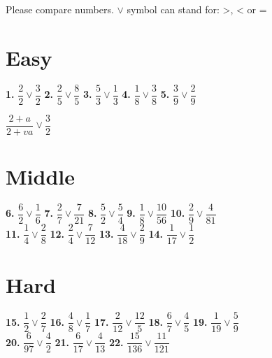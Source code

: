 \documentclass[a4paper]{article}
\begin{document}
{\large Please compare numbers. $\vee$ symbol can stand for: >, < or =}	
		
\section* {\Large Easy}
		
\Large {
\textbf{1.} $\dfrac{2}{2}\vee\dfrac{3}{2}$ \hspace{0.25cm}
\textbf{2.} $\dfrac{2}{5}\vee\dfrac{8}{5}$ \hspace{0.25cm}
\textbf{3.} $\dfrac{5}{3}\vee\dfrac{1}{3}$ \hspace{0.25cm}
\textbf{4.} $\dfrac{1}{8}\vee\dfrac{3}{8}$ \hspace{0.25cm}
\textbf{5.} $\dfrac{3}{9}\vee\dfrac{2}{9}$
}

$\dfrac{2+a}{2+va}\vee\dfrac{3}{2}$
		
\section* {\Large Middle}
		
\Large {
\textbf{6.} $\dfrac{6}{2}\vee\dfrac{1}{6}$ \hspace{0.25cm}
\textbf{7.} $\dfrac{2}{7}\vee\dfrac{7}{21}$ \hspace{0.25cm}
\textbf{8.} $\dfrac{5}{2}\vee\dfrac{5}{4}$ \hspace{0.25cm}
\textbf{9.} $\dfrac{1}{8}\vee\dfrac{10}{56}$ \hspace{0.25cm}
\textbf{10.} $\dfrac{2}{9}\vee\dfrac{4}{81}$ \\ [0.25cm]
\textbf{11.} $\dfrac{1}{4}\vee\dfrac{2}{8}$ \hspace{0.25cm}
\textbf{12.} $\dfrac{2}{4}\vee\dfrac{7}{12}$ \hspace{0.25cm}
\textbf{13.} $\dfrac{4}{18}\vee\dfrac{2}{9}$ \hspace{0.25cm}
\textbf{14.} $\dfrac{1}{17}\vee\dfrac{1}{2}$
}
		
\section* {\Large Hard}

\Large {
\textbf{15.} $\dfrac{1}{2}\vee\dfrac{2}{7}$ \hspace{0.25cm}
\textbf{16.} $\dfrac{4}{8}\vee\dfrac{1}{7}$ \hspace{0.25cm}
\textbf{17.} $\dfrac{2}{12}\vee\dfrac{12}{5}$ \hspace{0.25cm}
\textbf{18.} $\dfrac{6}{7}\vee\dfrac{4}{5}$  \hspace{0.25cm}
\textbf{19.} $\dfrac{1}{19}\vee\dfrac{5}{9}$ \\[0.25cm]
\textbf{20.} $\dfrac{6}{97}\vee\dfrac{4}{2}$ \hspace{0.25cm}
\textbf{21.} $\dfrac{6}{17}\vee\dfrac{4}{13}$ \hspace{0.25cm}
\textbf{22.} $\dfrac{15}{136}\vee\dfrac{11}{121}$
}
\end{document}
